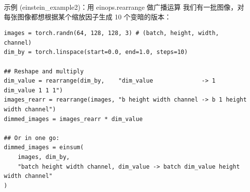 \begin{tipbox}{示例 (einstein\_example2)：用 einops.rearrange 做广播运算}
我们有一批图像，对每张图像都想根据某个缩放因子生成 10 个变暗的版本：
\begin{lstlisting}
images = torch.randn(64, 128, 128, 3) # (batch, height, width, channel)
dim_by = torch.linspace(start=0.0, end=1.0, steps=10)

## Reshape and multiply
dim_value = rearrange(dim_by,    "dim_value              -> 1 dim_value 1 1 1")
images_rearr = rearrange(images, "b height width channel -> b 1 height width channel")
dimmed_images = images_rearr * dim_value

## Or in one go:
dimmed_images = einsum(
    images, dim_by,
    "batch height width channel, dim_value -> batch dim_value height width channel"
)
\end{lstlisting}
\end{tipbox}

